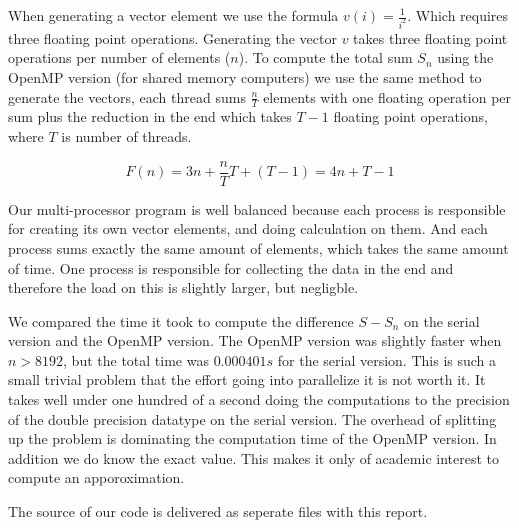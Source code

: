 \documentclass{article}
\begin{document}
    
    When generating a vector element we use the formula $ v(i) = \frac{1}{i^2}$. Which requires three floating point operations. Generating the vector $v$ takes three floating point operations per number of elements ($n$). To compute the total sum $S_n$ using the OpenMP version (for shared memory computers) we use the same method to generate the vectors, each thread sums $\frac{n}{T}$ elements with one floating operation per sum plus the reduction in the end which takes $T-1$ floating point operations, where $T$ is number of threads.

    $$ F(n) = 3n + \frac{n}{T}T+(T-1) = 4n + T - 1 $$
    
    
    Our multi-processor program is well balanced because each process is responsible for creating its own vector elements, and doing calculation on them. And each process sums exactly the same amount of elements, which takes the same amount of time. One process is responsible for collecting the data in the end and therefore the load on this is slightly larger, but negligble.
    
    
    We compared the time it took to compute the difference $ S - S_n $ on the serial version and the OpenMP version. The OpenMP version was slightly faster when $n>8192$, but the total time was $0.000401s$  for the serial version. This is such a small trivial problem that the effort going into parallelize it is not worth it. It takes well under one hundred of a second doing the computations to the precision of the double precision datatype on the serial version. The overhead of splitting up the problem is dominating the computation time of the OpenMP version. In addition we do know the exact value. This makes it only of academic interest to compute an apporoximation.
    

    The source of our code is delivered as seperate files with this report.



\end{document}
